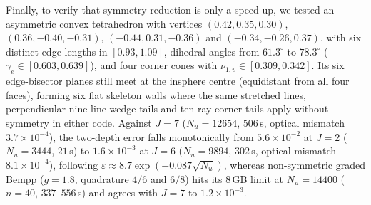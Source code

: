Finally, to verify that symmetry reduction is only a speed-up, we tested an asymmetric convex tetrahedron with vertices $(0.42,\allowbreak 0.35,\allowbreak 0.30)$, $(0.36,\allowbreak -0.40,\allowbreak -0.31)$, $(-0.44,\allowbreak 0.31,\allowbreak -0.36)$ and $(-0.34,\allowbreak -0.26,\allowbreak 0.37)$, with six distinct edge lengths in $[0.93,1.09]$, dihedral angles from $61.3^\circ$ to $78.3^\circ$ ($\gamma_e\in[0.603,\allowbreak 0.639]$), and four corner cones with $\nu_{1,v}\in[0.309,\allowbreak 0.342]$. Its six edge-bisector planes still meet at the insphere centre (equidistant from all four faces), forming six flat skeleton walls where the same stretched lines, perpendicular nine-line wedge tails and ten-ray corner tails apply without symmetry in either code. Against $J = 7$ ($N_u = 12654$, $506$\,s, optical mismatch $3.7\times10^{-4}$), the two-depth error falls monotonically from $5.6\times10^{-2}$ at $J = 2$ ($N_u = 3444$, $21$\,s) to $1.6\times10^{-3}$ at $J = 6$ ($N_u = 9894$, $302$\,s, optical mismatch $8.1\times10^{-4}$), following $\varepsilon\approx 8.7\exp(-0.087\sqrt{N_u})$, whereas non-symmetric graded Bempp ($g = 1.8$, quadrature $4/6$ and $6/8$) hits its $8$\,GB limit at $N_u = 14400$ ($n = 40$, $337\text{--}556$\,s) and agrees with $J = 7$ to $1.2\times10^{-3}$.


